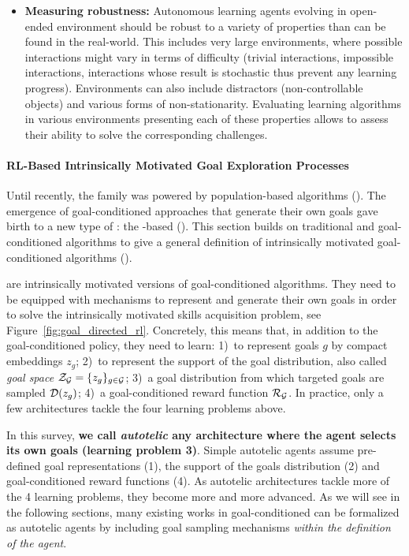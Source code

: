 \begin{itemize}
    \item
    \textbf{Measuring robustness:} Autonomous learning agents evolving in open-ended environment should be robust to a variety of properties than can be found in the real-world. This includes very large environments, where possible interactions might vary in terms of difficulty (trivial interactions, impossible interactions, interactions whose result is stochastic thus prevent any learning progress). Environments can also include distractors (\eg non-controllable objects) and various forms of non-stationarity. Evaluating learning algorithms in various environments presenting each of these properties allows to assess their ability to solve the corresponding challenges.
\end{itemize}

 
\paragraph{RL-Based Intrinsically Motivated Goal Exploration Processes}
\label{sec:gcimgep_solutions}
Until recently, the \imgep family was powered by population-based algorithms (\popimgep). The emergence of goal-conditioned \rl approaches that generate their own goals gave birth to a new type of \imgeps: the \rl-based \imgeps (\rlimgep). This section builds on traditional \rl and goal-conditioned \rl algorithms to give a general definition of intrinsically motivated goal-conditioned \rl algorithms (\rlimgep).

\rlimgep are intrinsically motivated versions of goal-conditioned \rl algorithms. They need to be equipped with mechanisms to represent and generate their own goals in order to solve the intrinsically motivated skills acquisition problem, see Figure~\ref{fig:goal_directed_rl}. Concretely, this means that, in addition to the goal-conditioned policy, they need to learn: 1)~to represent goals $g$ by compact embeddings $z_g$; 2)~to represent the support of the goal distribution, also called \textit{goal space} $\mathcal{Z}_{\mathcal{G}}=\{z_g\}_{g\in\mathcal{G}}$; 3)~a goal distribution from which targeted goals are sampled $\mathcal{D}(z_g)$; 4)~a goal-conditioned reward function $\mathcal{R}_{\mathcal{G}}$. In practice, only a few architectures tackle the four learning problems above. 

In this survey, \textbf{we call \textit{autotelic} any architecture where the agent selects its own goals (learning problem 3)}. Simple autotelic agents assume pre-defined goal representations (1), the support of the goals distribution (2) and goal-conditioned reward functions (4). As autotelic architectures tackle more of the 4 learning problems, they become more and more advanced. As we will see in the following sections, many existing works in goal-conditioned \rl can be formalized as autotelic agents by including goal sampling mechanisms \textit{within the definition of the agent}. 

